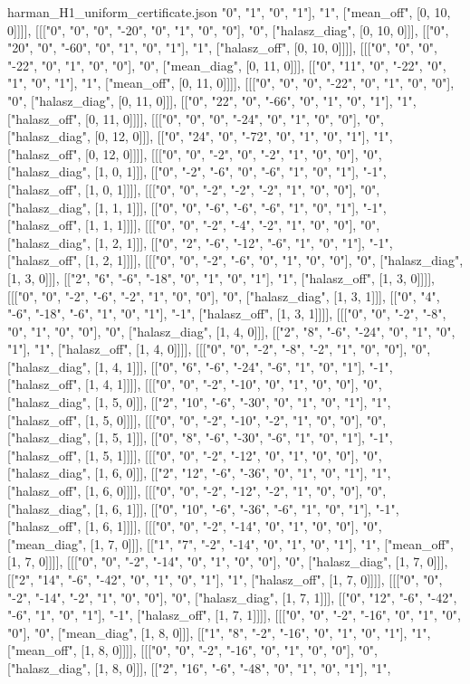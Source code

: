 \begin{filecontents*}[overwrite]{harman_H1_uniform_certificate.json}
"0", "1", "0", "1"], "1", ["mean_off", [0, 10, 0]]]], [[["0", "0", "0", "-20", "0", "1", "0", "0"], "0", ["halasz_diag", [0, 10, 0]]], [["0", "20", "0", "-60", "0", "1", "0", "1"], "1", ["halasz_off", [0, 10, 0]]]], [[["0", "0", "0", "-22", "0", "1", "0", "0"], "0", ["mean_diag", [0, 11, 0]]], [["0", "11", "0", "-22", "0", "1", "0", "1"], "1", ["mean_off", [0, 11, 0]]]], [[["0", "0", "0", "-22", "0", "1", "0", "0"], "0", ["halasz_diag", [0, 11, 0]]], [["0", "22", "0", "-66", "0", "1", "0", "1"], "1", ["halasz_off", [0, 11, 0]]]], [[["0", "0", "0", "-24", "0", "1", "0", "0"], "0", ["halasz_diag", [0, 12, 0]]], [["0", "24", "0", "-72", "0", "1", "0", "1"], "1", ["halasz_off", [0, 12, 0]]]], [[["0", "0", "-2", "0", "-2", "1", "0", "0"], "0", ["halasz_diag", [1, 0, 1]]], [["0", "-2", "-6", "0", "-6", "1", "0", "1"], "-1", ["halasz_off", [1, 0, 1]]]], [[["0", "0", "-2", "-2", "-2", "1", "0", "0"], "0", ["halasz_diag", [1, 1, 1]]], [["0", "0", "-6", "-6", "-6", "1", "0", "1"], "-1", ["halasz_off", [1, 1, 1]]]], [[["0", "0", "-2", "-4", "-2", "1", "0", "0"], "0", ["halasz_diag", [1, 2, 1]]], [["0", "2", "-6", "-12", "-6", "1", "0", "1"], "-1", ["halasz_off", [1, 2, 1]]]], [[["0", "0", "-2", "-6", "0", "1", "0", "0"], "0", ["halasz_diag", [1, 3, 0]]], [["2", "6", "-6", "-18", "0", "1", "0", "1"], "1", ["halasz_off", [1, 3, 0]]]], [[["0", "0", "-2", "-6", "-2", "1", "0", "0"], "0", ["halasz_diag", [1, 3, 1]]], [["0", "4", "-6", "-18", "-6", "1", "0", "1"], "-1", ["halasz_off", [1, 3, 1]]]], [[["0", "0", "-2", "-8", "0", "1", "0", "0"], "0", ["halasz_diag", [1, 4, 0]]], [["2", "8", "-6", "-24", "0", "1", "0", "1"], "1", ["halasz_off", [1, 4, 0]]]], [[["0", "0", "-2", "-8", "-2", "1", "0", "0"], "0", ["halasz_diag", [1, 4, 1]]], [["0", "6", "-6", "-24", "-6", "1", "0", "1"], "-1", ["halasz_off", [1, 4, 1]]]], [[["0", "0", "-2", "-10", "0", "1", "0", "0"], "0", ["halasz_diag", [1, 5, 0]]], [["2", "10", "-6", "-30", "0", "1", "0", "1"], "1", ["halasz_off", [1, 5, 0]]]], [[["0", "0", "-2", "-10", "-2", "1", "0", "0"], "0", ["halasz_diag", [1, 5, 1]]], [["0", "8", "-6", "-30", "-6", "1", "0", "1"], "-1", ["halasz_off", [1, 5, 1]]]], [[["0", "0", "-2", "-12", "0", "1", "0", "0"], "0", ["halasz_diag", [1, 6, 0]]], [["2", "12", "-6", "-36", "0", "1", "0", "1"], "1", ["halasz_off", [1, 6, 0]]]], [[["0", "0", "-2", "-12", "-2", "1", "0", "0"], "0", ["halasz_diag", [1, 6, 1]]], [["0", "10", "-6", "-36", "-6", "1", "0", "1"], "-1", ["halasz_off", [1, 6, 1]]]], [[["0", "0", "-2", "-14", "0", "1", "0", "0"], "0", ["mean_diag", [1, 7, 0]]], [["1", "7", "-2", "-14", "0", "1", "0", "1"], "1", ["mean_off", [1, 7, 0]]]], [[["0", "0", "-2", "-14", "0", "1", "0", "0"], "0", ["halasz_diag", [1, 7, 0]]], [["2", "14", "-6", "-42", "0", "1", "0", "1"], "1", ["halasz_off", [1, 7, 0]]]], [[["0", "0", "-2", "-14", "-2", "1", "0", "0"], "0", ["halasz_diag", [1, 7, 1]]], [["0", "12", "-6", "-42", "-6", "1", "0", "1"], "-1", ["halasz_off", [1, 7, 1]]]], [[["0", "0", "-2", "-16", "0", "1", "0", "0"], "0", ["mean_diag", [1, 8, 0]]], [["1", "8", "-2", "-16", "0", "1", "0", "1"], "1", ["mean_off", [1, 8, 0]]]], [[["0", "0", "-2", "-16", "0", "1", "0", "0"], "0", ["halasz_diag", [1, 8, 0]]], [["2", "16", "-6", "-48", "0", "1", "0", "1"], "1", 
\end{filecontents*}
